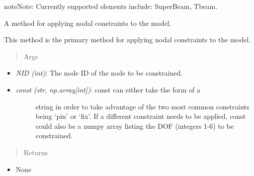 \documentclass[letterpaper,10pt,english]{sphinxmanual}
\begin{document}
\begin{fulllineitems}
\begin{fulllineitems}
\begin{notice}{note}{Note:}
Currently supported elements include: SuperBeam, Tbeam.
\end{notice}

\end{fulllineitems}


\begin{fulllineitems}
\label{FEM:AeroComBAT.FEM.Model.applyConstraints}
A method for applying nodal constraints to the model.

This method is the primary method for applying nodal constraints to the
model.
\begin{quote}\begin{description}
\item[{Args}] \leavevmode
\end{description}\end{quote}
\begin{itemize}
\item {} 
\emph{NID (int)}: The node ID of the node to be constrained.

\item {} \begin{description}
\item[{\emph{const (str, np.array{[}int{]})}: const can either take the form of a}] \leavevmode
string in order to take advantage of the two most common
constraints being `pin' or `fix'. If a different constraint needs
to be applied, const could also be a numpy array listing the DOF
(integers 1-6) to be constrained.

\end{description}

\end{itemize}
\begin{quote}\begin{description}
\item[{Returns}] \leavevmode
\end{description}\end{quote}
\begin{itemize}
\item {} 
None

\end{itemize}

\end{fulllineitems}



\end{fulllineitems}
\end{document}
